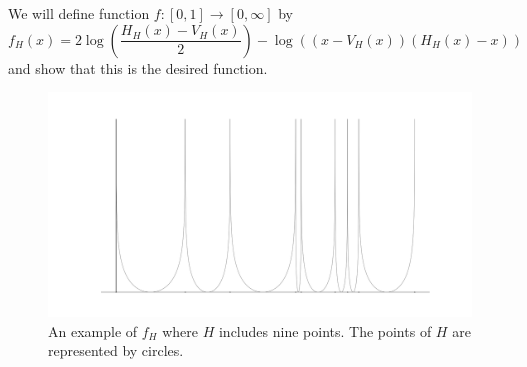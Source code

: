 \documentclass[a4paper,12pt,twoside,BCOR=10mm]{scrbook}
\theoremstyle{definition}
\theoremstyle{definition}
\theoremstyle{definition}
\begin{document}
We will define function $f: [0, 1] \rightarrow [0, \infty]$ by
\[
	f_H(x) = 2\log \left ( \frac{H_H(x) - V_H(x)}{2} \right ) - \log((x - V_H(x))(H_H(x) - x))
\]
and show that this is the desired function.
\begin{figure}[h]
\centering
\includegraphics[width=1\textwidth]{graph8}
\caption{An example of $f_H$ where $H$ includes nine points. The points of $H$ are represented by circles. }
\end{figure}
\end{document}

